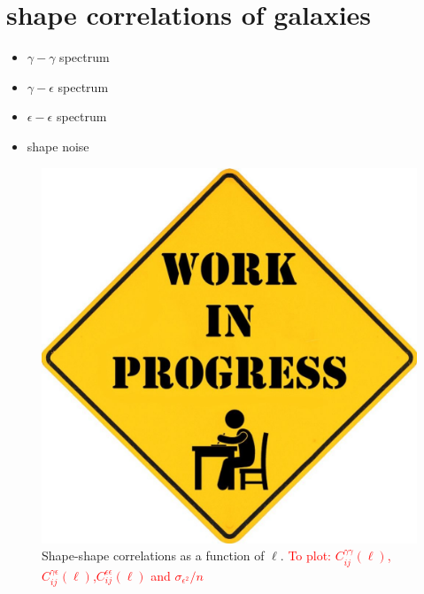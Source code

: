 \documentclass[a4paper,fleqn,usenatbib]{mnras}
\newcommand\BG[1]{\textcolor{red}{#1}}
\begin{document}
\section{shape correlations of galaxies}\label{sect_shapes}
\begin{itemize}
    \item $\gamma-\gamma$ spectrum 
    \item $\gamma-\epsilon$ spectrum
    \item $\epsilon-\epsilon$ spectrum
    \item shape noise
\end{itemize}
\begin{figure}
    \centering
    \includegraphics[scale=0.1]{wip.jpg}
    \caption{Shape-shape correlations as a function of $\ell$. \BG{To plot: $C_{ij}^{\gamma\gamma}(\ell)$,$C_{ij}^{\gamma\epsilon}(\ell)$,$C_{ij}^{\epsilon\epsilon}(\ell)$ and $\sigma_{\epsilon^2}/n$}}
    \label{fig:shapeshape}
\end{figure}
\end{document}
